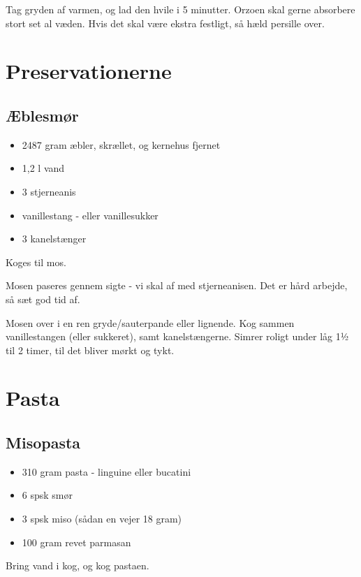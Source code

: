 \documentclass[
]{book}
\providecommand{\tightlist}{%
  \setlength{\itemsep}{0pt}\setlength{\parskip}{0pt}}
\begin{document}
Tag gryden af varmen, og lad den hvile i 5 minutter. Orzoen skal gerne absorbere
stort set al væden. Hvis det skal være ekstra festligt, så hæld persille over.

\chapter{Preservationerne}\label{preservationerne}

\section{Æblesmør}\label{uxe6blesmuxf8r}

\begin{itemize}
\tightlist
\item
  2487 gram æbler, skrællet, og kernehus fjernet
\item
  1,2 l vand
\item
  3 stjerneanis
\item
  vanillestang - eller vanillesukker
\item
  3 kanelstænger
\end{itemize}

Koges til mos.

Mosen paseres gennem sigte - vi skal af med stjerneanisen.
Det er hård arbejde, så sæt god tid af.

Mosen over i en ren gryde/sauterpande eller lignende.
Kog sammen vanillestangen (eller sukkeret), samt kanelstængerne.
Simrer roligt under låg 1½ til 2 timer, til det bliver mørkt og tykt.

\chapter{Pasta}\label{pasta}

\section{Misopasta}\label{misopasta}

\begin{itemize}
\tightlist
\item
  310 gram pasta - linguine eller bucatini
\item
  6 spsk smør
\item
  3 spsk miso (sådan en vejer 18 gram)
\item
  100 gram revet parmasan
\end{itemize}

Bring vand i kog, og kog pastaen.
\end{document}
